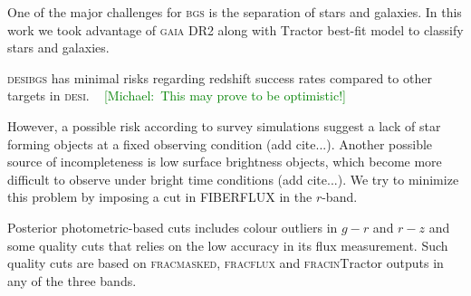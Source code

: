 \documentclass[fleqn,usenatbib]{mnras}
\newcommand{\mike}[1]{~\newline\noindent \textcolor{Green}{{ [Michael:~{#1}]\\}}}
\newcommand{\warn}[2]{\textcolor{Green}{\cancel{{ #1}} {#2}}}
\newcommand{\BGS}{\textsc{bgs}\xspace}
\newcommand{\DESI}{\textsc{desi}\xspace}
\newcommand{\FRACMASK}{{\textsc{fracmasked}}\xspace}
\newcommand{\FRACFLUX}{{\textsc{fracflux}}\xspace}
\newcommand{\FRACIN}{{\textsc{fracin}}\xspace}
\newcommand{\GAIA}{\textsc{gaia}\xspace}
\newcommand{\TRACTOR}{\textsc{T}ractor\xspace}
\begin{document}
One of the major challenges for \BGS is the separation of stars and galaxies. In this work we took advantage of \GAIA DR2 \citep{2018A&A...616A...1G} along with \TRACTOR best-fit model to classify stars and galaxies. 

\DESI \BGS has minimal risks regarding redshift success rates compared to other targets in \DESI.  
\mike{This may prove to be optimistic!}

However, a possible risk according to survey simulations suggest a lack of star forming objects at a fixed observing condition (add cite...). Another possible source of incompleteness is low surface brightness objects, which become more difficult to observe under bright time conditions (add cite...). We try to minimize this problem by imposing a cut in FIBERFLUX in the $r$-band.

Posterior photometric-based cuts includes \warn{weird}{} colour outliers in $g-r$ and $r-z$ and some quality cuts that relies on the low accuracy in its flux measurement. Such quality cuts are based on \FRACMASK, \FRACFLUX and \FRACIN \TRACTOR outputs in any of the three bands.
\end{document}

